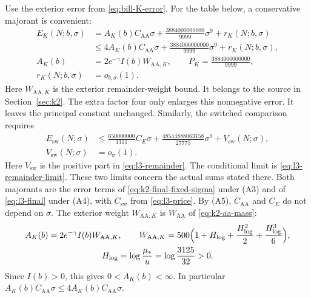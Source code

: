 Use the exterior error from \eqref{eq:bill-K-error}.
For the table below, a conservative majorant is convenient:
\begin{equation}\label{eq:bill-K-error}
\begin{aligned}
 E_K(N;b,\sigma)
 &=A_K(b)C_{\mathrm{AA}}\sigma
      +\frac{3884000000000}{9999}\sigma^9+r_K(N;b,\sigma)\\
 &\le 4A_K(b)C_{\mathrm{AA}}\sigma
      +\frac{3884000000000}{9999}\sigma^9
      +r_K(N;b,\sigma),\\
 A_K(b)&=2e^{-\gamma}I(b)W_{\mathrm{AA},K},\qquad
 P_K=\frac{3884000000000}{9999},\\
 r_K(N;b,\sigma)&=o_{b,\sigma}(1).
\end{aligned}
\end{equation}
Here $W_{\mathrm{AA},K}$ is the exterior remainder-weight bound.
It belongs to the source in Section~\ref{sec:k2}.
The extra factor four only enlarges this nonnegative error.
It leaves the principal constant unchanged.
Similarly, the switched comparison requires
\begin{equation}\label{eq:bill-sw-error}
\begin{aligned}
 E_{\mathrm{sw}}(N;\sigma)
 &\le \frac{650000000}{1111}C_E\sigma
       +\frac{48544888063158}{27775}\sigma^9
       +V_{\mathrm{sw}}(N;\sigma),\\
 V_{\mathrm{sw}}(N;\sigma)&=o_\sigma(1).
\end{aligned}
\end{equation}
Here $V_{\mathrm{sw}}$ is the positive part in
\eqref{eq:l3-remainder}.
The conditional limit is \eqref{eq:l3-remainder-limit}.
These two limits concern the actual sums stated there.
Both majorants are the error terms of \eqref{eq:k2-final-fixed-sigma} under
\textup{(A3)} and of \eqref{eq:l3-final} under \textup{(A4)}, with
$C_{\mathrm{sw}}$ from \eqref{eq:l3-price}. By \textup{(A5)},
$C_{\mathrm{AA}}$ and $C_E$ do not depend on $\sigma$. The exterior weight
$W_{\mathrm{AA},K}$ is $W_{\mathrm{AA}}$ of \eqref{eq:k2-aa-mass}:
\begin{equation}\label{eq:bill-AK-positive}
\begin{gathered}
 A_K(b)=2e^{-\gamma}I(b)W_{\mathrm{AA},K},\qquad
 W_{\mathrm{AA},K}=500\Bigl(1+H_{\log}+\frac{H_{\log}^2}2
                    +\frac{H_{\log}^3}6\Bigr),\\
 H_{\log}=\log\frac{\mu_*}{u}=\log\frac{3125}{32}>0.
\end{gathered}
\end{equation}
Since $I(b)>0$, this gives $0<A_K(b)<\infty$. In particular
$A_K(b)C_{\mathrm{AA}}\sigma\le4A_K(b)C_{\mathrm{AA}}\sigma$.

